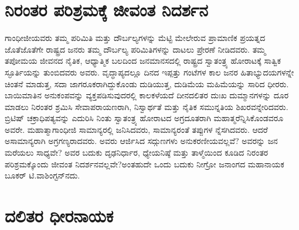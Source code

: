 \section*{ನಿರಂತರ ಪರಿಶ್ರಮಕ್ಕೆ ಜೀವಂತ ನಿದರ್ಶನ}


ಗಾಂಧೀಜೀಯವರು ತಮ್ಮ ಪರಿಮಿತಿ ಮತ್ತು ದೌರ್ಬಲ್ಯಗಳನ್ನು ಮೆಟ್ಟಿ ಮೇಲೇರುವ ಪ್ರಾಮಾಣಿಕ ಪ್ರಯತ್ನದ ಜೊತೆಜೊತೆಗೇ ರಾಷ್ಟ್ರದ ಜನರು ತಮ್ಮ ದೌರ್ಬಲ್ಯ ಪರಿಮಿತಿಗಳನ್ನು ದಾಟಲು ಪ್ರೇರಣೆ ನೀಡಿದವರು. ತಮ್ಮ ತಪೋಮಯ ಜೀವನದ ನೈತಿಕ, ಆಧ್ಯಾತ್ಮಿಕ ಬಲದಿಂದ ಜನಮಾನಸದಲ್ಲಿ ರಾಷ್ಟ್ರದ ಸ್ವಾತಂತ್ರ್ಯ ಹೋರಾಟಕ್ಕೆ ಸಾತ್ವಿಕ ಸ್ಫೂರ್ತಿಯನ್ನು ತುಂಬಿದವರು ಅವರು. ವೃದ್ಧಾಪ್ಯದಲ್ಲೂ ದಿನದ ಇಪ್ಪತ್ತು ಗಂಟೆಗಳ ಕಾಲ ಜನರ ಹಿತಾಭ್ಯುದಯಗಳನ್ನೇ ಚಿಂತನೆ ಮಾಡುತ್ತ, ಸದಾ ಜಾಗರೂಕರಾಗಿದ್ದುಕೊಂಡು ದುಡಿಯುತ್ತ, ದುಡಿಮೆಯ ಮಹಿಮೆಯನ್ನು ಸಾರಿದ ಧೀರರು. ಬಾಯಿಮಾತಿನ ಅನುಕಂಪವನ್ನು ವ್ಯಕ್ತಪಡಿಸುವುದರಲ್ಲಿ ಕಾಲಕಳೆಯದೆ ದೀನದಲಿತರ ದುಃಖ ದುಮ್ಮಾನಗಳನ್ನು ದೂರ ಮಾಡಲು ನಿರಂತರ ಶ್ರಮಿಸಿ ಸೇವಾಪರಾಯಣರಾಗಿ, ನಿಸ್ವಾರ್ಥತೆ ಮತ್ತು ನೈತಿಕ ಸಮುನ್ನತಿಯ ಶಿಖರವನ್ನೇರಿದವರು. ಬ್ರಿಟಿಷ್ ಚಕ್ರಾಧಿಪತ್ಯವನ್ನು ಎದುರಿಸಿ ನಿಂತು ಸ್ವಾತಂತ್ರ್ಯ ಹೋರಾಟದ ಅಗ್ರದೂತರಾಗಿ ಮಹಾತ್ಮರೆನ್ನಿಸಿಕೊಂಡವರೂ ಅವರೇ. ಮಹಾತ್ಮಾ\-ಗಾಂಧೀಜಿ ಸಾಮಾನ್ಯರಲ್ಲಿ ಜನಿಸಿದವರು, ಸಾಮಾನ್ಯರಂತೆ ತಪ್ಪುಗಳ ನ್ನೆಸಗಿದವರು. ಆದರೆ ಅಸಾಮಾನ್ಯರಾಗಿ ಅಗ್ರಗಣ್ಯರಾದವರು. ಅವರು ಆರ್ಜಿಸಿದ ಸದ್ಗುಣಗಳು ಅನುಕರಣೀಯ\-ವಲ್ಲವೆ? ಅವರನ್ನು ಜನ ಮರೆಯಲು ಸಾಧ್ಯವೇ? ಅವರ ಬದುಕು ದೃಢನಿರ್ಧಾರ, ಧ್ಯೇಯನಿಷ್ಠೆ ಮತ್ತು ತಾಳ್ಮೆಯಿಂದ ಕೂಡಿದ ನಿರಂತರ ಪರಿಶ್ರಮಕ್ಕೊಂದು ಜೀವಂತ ನಿದರ್ಶನವಲ್ಲವೇ?\break ಅಂತಹುದೇ ಒಂದು ಬದುಕು ನೀಗ್ರೋ ಜನಾಂಗದ ಮಹಾನಾಯಕ ಬೂಕರ್ ಟಿ.\break ವಾಶಿಂಗ್ಟನ್​ನದು.

\newpage


\section*{ದಲಿತರ ಧೀರನಾಯಕ}


